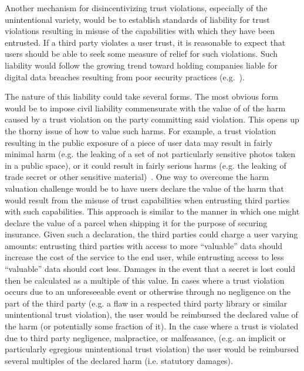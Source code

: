 Another mechanism for disincentivizing trust violations, especially of
the unintentional variety, would be to establish standards of
liability for trust violations resulting in misuse of the capabilities
with which they have been entrusted. If a third party violates a user
trust, it is reasonable to expect that users should be able to seek
some measure of relief for such violations. Such liability would
follow the growing trend toward holding companies liable for digital
data breaches resulting from poor security practices
(e.g.~\cite{ftc-asus}).

The nature of this liability could take several forms. The most
obvious form would be to impose civil liability commensurate with the
value of of the harm caused by a trust violation on the party
committing said violation. This opens up the thorny issue of how to
value such harms. For example, a trust violation resulting in the
public exposure of a piece of user data may result in fairly minimal
harm (e.g. the leaking of a set of not particularly sensitive photos
taken in a public space), or it could result in fairly serious harms
(e.g. the leaking of trade secret or other sensitive
material)~\cite{acquisti2013, romanosky2009}. One way to overcome the
harm valuation challenge would be to have users declare the value of
the harm that would result from the misuse of trust capabilities when
entrusting third parties with such capabilities. This approach is
similar to the manner in which one might declare the value of a parcel
when shipping it for the purpose of securing insurance. Given such a
declaration, the third parties could charge a user varying amounts:
entrusting third parties with access to more ``valuable'' data should
increase the cost of the service to the end user, while entrusting
access to less ``valuable'' data should cost less. Damages in the
event that a secret is lost could then be calculated as a multiple of
this value. In cases where a trust violation occurs due to an
unforeseeable event or otherwise through no negligence on the part of
the third party (e.g. a flaw in a respected third party library or
similar unintentional trust violation), the user would be reimbursed
the declared value of the harm (or potentially some fraction of
it). In the case where a trust is violated due to third party
negligence, malpractice, or malfeasance, (e.g. an implicit or
particularly egregious unintentional trust violation) the user would
be reimbursed several multiples of the declared harm (i.e. statutory
damages).

